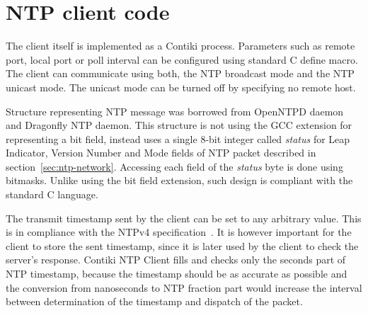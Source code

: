 
\section{NTP client code}
The client itself is implemented as a Contiki process.
Parameters such as remote port, local port or poll interval
can be configured using standard C define macro.
The client can communicate using both,
the NTP broadcast mode and the NTP unicast mode.
The unicast mode can be turned off by specifying no remote host.

Structure representing NTP message was borrowed from OpenNTPD daemon
and Dragonfly NTP daemon.
This structure is not using the GCC extension for representing a bit field,
instead uses a single 8-bit integer called {\it{status}}
for Leap Indicator, Version Number and Mode fields of NTP packet
described in section~\ref{sec:ntp-network}.
Accessing each field of the {\it{status}} byte is done using bitmasks.
Unlike using the bit field extension,
such design is compliant with the standard C language.





The transmit timestamp sent by the client can be set to any arbitrary value.
This is in compliance with the NTPv4 specification~\cite{rfc5905}.
It is however important for the client to store the sent timestamp,
since it is later used by the client to check the server's response.
Contiki NTP Client fills and checks only the seconds part of NTP timestamp,
because the timestamp should be as accurate as possible and the
conversion from nanoseconds to NTP fraction part would increase the interval
between determination of the timestamp and dispatch of the packet.

